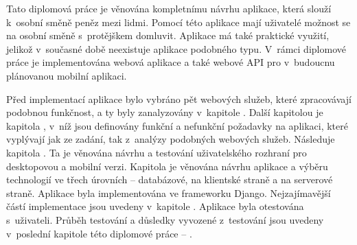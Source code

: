 \begin{introduction}
Tato diplomová práce je věnována kompletnímu návrhu aplikace, která slouží k~osobní směně peněz mezi lidmi. Pomocí této aplikace mají uživatelé možnost se na osobní směně s~protějškem domluvit. Aplikace má také praktické využití, jelikož v~současné době neexistuje aplikace podobného typu. V~rámci diplomové práce je implementována webová aplikace a také webové API pro v~budoucnu plánovanou mobilní aplikaci.

Před implementací aplikace bylo vybráno pět webových služeb, které zpracovávají podobnou funkčnost, a ty byly zanalyzovány v~kapitole \textit{}. Další kapitolou je kapitola \textit{}, v~níž jsou definovány funkční a nefunkční požadavky na aplikaci, které vyplývají jak ze zadání, tak z~analýzy podobných webových služeb. Následuje kapitola \textit{}. Ta je věnována návrhu a testování uživatelského rozhraní pro desktopovou a mobilní verzi. Kapitola \textit{} je věnována návrhu aplikace a výběru technologií ve třech úrovních -- databázové, na klientské straně a na serverové straně. Aplikace byla implementována ve frameworku Django. Nejzajímavější částí implementace jsou uvedeny v~kapitole \textit{}. Aplikace byla otestována s~uživateli. Průběh testování a důsledky vyvozené z~testování jsou uvedeny v~poslední kapitole této diplomové práce -- \textit{}.
\end{introduction}